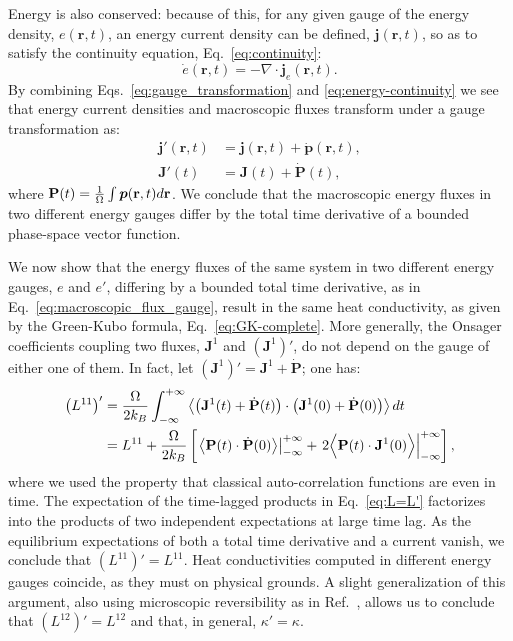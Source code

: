 Energy is also conserved: because of this, for any given gauge of the energy density, $e(\mathbf{r},t)$, an energy current density can be defined, $\bm{j}(\mathbf{r},t)$, so as to satisfy the continuity equation, Eq.~\eqref{eq:continuity}:
\begin{equation}
  \dot{e}(\mathbf{r},t)=-\nabla\cdot
  \mathbf{j}_{e}(\mathbf{r},t). \label{eq:energy-continuity} 
\end{equation}
By combining Eqs.~\eqref{eq:gauge_transformation} and \eqref{eq:energy-continuity} we see that energy current densities and macroscopic fluxes transform under a gauge transformation as:
\begin{align}
 \bm{j}'(\mathbf{r},t) & = \bm{j}(\mathbf{r},t) + \dot{\bm{p}}(\mathbf{r},t), \label{eq:current_density_gauge} \\
  \mathbf{J}'(t) & = \mathbf{J}(t) + \dot{\mathbf{P}}(t), \label{eq:macroscopic_flux_gauge}
\end{align}
where $\mathbf{P}(t)=\frac{1}{{\mathrm\Omega}} \int\bm{p}(\mathbf{r},t)d\mathbf{r}$. We
conclude that the macroscopic energy fluxes in two different energy gauges differ by the total time derivative of a bounded phase-space vector function.

We now show that the energy fluxes of the same system in two different energy gauges, $e$ and $e'$, differing by a bounded total time derivative, as in Eq.~\eqref{eq:macroscopic_flux_gauge}, result in the same heat conductivity, as given by the Green-Kubo formula, Eq.~\eqref{eq:GK-complete}. More generally, the Onsager coefficients coupling two fluxes, $\mathbf{J}^1$ and $\left(\mathbf{J}^1\right)'$, do not depend on the gauge of either one of them. In fact, let $\left(\mathbf{J}^1\right)' = \mathbf{J}^1 + \dot{\mathbf{P}}$; one has:
\begin{equation}
  \begin{aligned}
    \left (L^{11} \right)' &= \frac{\rOmega}{2 k_B }\int_{-\infty}^{+\infty} \left \langle \left (\mathbf{J}^1(t)+\dot{\mathbf{P}}(t) \right ) \cdot  \left (\mathbf{J}^1(0)+\dot{\mathbf{P}}(0)\right ) \right \rangle dt \\
    &= L^{11} + \frac{\rOmega}{2 k_B } \left[ \left .  \left \langle \mathbf{P}(t) \cdot \dot{\mathbf{P}}(0) \right \rangle \right |^{+\infty}_{-\infty} + \left .  2 \Bigl \langle \mathbf{P}(t) \cdot \mathbf{J}^1(0) \Bigr \rangle \right |^{+\infty}_{-\infty} \right] ,
  \end{aligned} \label{eq:L=L'}
\end{equation}
where we used the property that classical auto-correlation functions are even in time.
The expectation of the time-lagged products in Eq.~\eqref{eq:L=L'} factorizes into the products of two independent expectations at large time lag. As the equilibrium expectations of both a total time derivative and a current vanish, we conclude that $\left (L^{11}\right )'=L^{11}$. Heat conductivities computed in different energy gauges coincide, as they must on physical grounds. A slight generalization of this argument, also using microscopic reversibility as in Ref.~\cite{Onsager1931a,Onsager1931b}, allows us to conclude that $\left (L^{12} \right )'=L^{12}$ and that, in general, $\kappa'=\kappa$.

